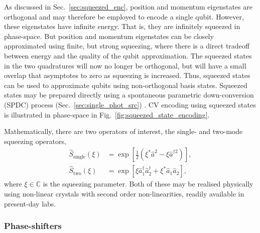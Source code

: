 As discussed in Sec.~\ref{sec:squeezed_enc}, position and momentum eigenstates are orthogonal and may therefore be employed to encode a single qubit. However, these eigenstates have infinite energy. That is, they are infinitely squeezed in phase-space. But position and momentum eigenstates can be closely approximated using finite, but strong squeezing, where there is a direct tradeoff between energy and the quality of the qubit approximation. The squeezed states in the two quadratures will now no longer be orthogonal, but will have a small overlap that asymptotes to zero as squeezing is increased. Thus, squeezed states can be used to approximate qubits using non-orthogonal basis states. Squeezed states may be prepared directly using a spontaneous parametric down-conversion (SPDC) process (Sec.~\ref{sec:single_phot_src}) \cite{bib:PhysRevLett.75.4337, bib:o2009photonic}. CV encoding using squeezed states is illustrated in phase-space in Fig.~\ref{fig:squeezed_state_encoding}.

Mathematically, there are two operators of interest, the single- and two-mode squeezing operators,
\begin{align}\label{eq:sq_op}
\hat{S}_\mathrm{single}(\xi) &= \exp\left[ \frac{1}{2}(\xi^*\hat{a}^2 - \xi{\hat{a}^{\dag 2}})\right],\nonumber\\
\hat{S}_\mathrm{two}(\xi) &= \exp\left[ \xi\hat{a}_1^\dag\hat{a}_2^\dag + \xi^*\hat{a}_1\hat{a}_2 \right],
\end{align}
where \mbox{$\xi\in \mathbb{C}$} is the squeezing parameter. Both of these may be realised physically using non-linear crystals with second order non-linearities, readily available in present-day labs.

%
%

\subsubsection{Phase-shifters}

